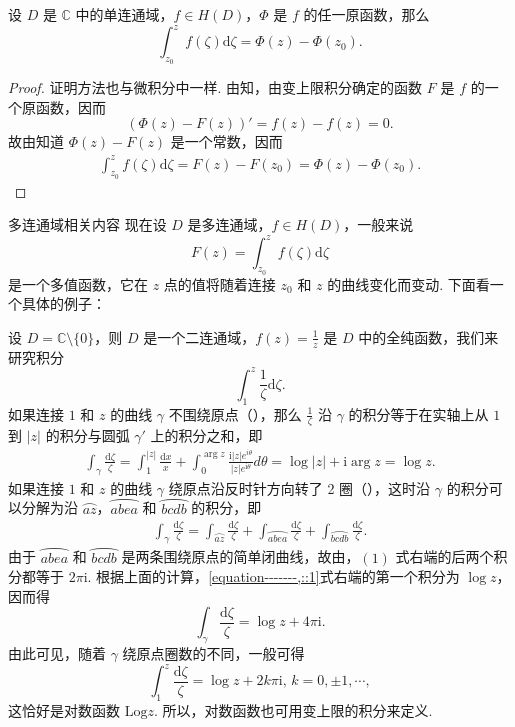 \documentclass[../../main.tex]{subfiles}
\begin{document}
\begin{theorem}\label{theorem:复积分的微分学基本定理}
设 \( D \) 是 \( \mathbb{C} \) 中的单连通域，\( f \in H(D) \)，\( \Phi \) 是 \( f \) 的任一原函数，那么
\[
\int_{z_0}^{z} f(\zeta) \mathrm{d}\zeta  = \Phi(z) - \Phi(z_0).
\]
\end{theorem}
\begin{proof}
证明方法也与微积分中一样. 由知，由变上限积分确定的函数 \( F \) 是 \( f \) 的一个原函数，因而
\[
(\Phi(z) - F(z))' = f(z) - f(z) = 0.
\]
故由知道 \( \Phi(z) - F(z) \) 是一个常数，因而
\begin{align*}
\int_{z_0}^{z} f(\zeta) \mathrm{d}\zeta  = F(z) - F(z_0) = \Phi(z) - \Phi(z_0).
\end{align*}

\end{proof}

多连通域相关内容
现在设 \( D \) 是多连通域，\( f \in H(D) \)，一般来说
\[
F(z) = \int_{z_0}^{z} f(\zeta) \mathrm{d}\zeta 
\]
是一个多值函数，它在 \( z \) 点的值将随着连接 \( z_0 \) 和 \( z \) 的曲线变化而变动. 下面看一个具体的例子：

设 \( D = \mathbb{C} \setminus \{0\} \)，则 \( D \) 是一个二连通域，\( f(z) = \frac{1}{z} \) 是 \( D \) 中的全纯函数，我们来研究积分
\[
\int_{1}^{z} \frac{1}{\zeta} \mathrm{d}\zeta .
\]
如果连接 \( 1 \) 和 \( z \) 的曲线 \( \gamma \) 不围绕原点（），那么 \( \frac{1}{\zeta} \) 沿 \( \gamma \) 的积分等于在实轴上从 \( 1 \) 到 \( |z| \) 的积分与圆弧 \( \gamma' \) 上的积分之和，即
\begin{align*}
\int_{\gamma} \frac{\mathrm{d}\zeta }{\zeta} = \int_{1}^{|z|} \frac{\mathrm{d}x}{x} + \int_{0}^{\arg z} \frac{\mathrm{i}|z|e^{i\theta}}{|z|e^{\mathrm{i}\theta}} d\theta = \log|z| + \mathrm{i}\arg z = \log z.
\end{align*}
如果连接 \( 1 \) 和 \( z \) 的曲线 \( \gamma \) 绕原点沿反时针方向转了 2 圈（），这时沿 \( \gamma \) 的积分可以分解为沿 \( \wideparen{az} \)，\( \wideparen{abea} \) 和 \( \wideparen{bcdb} \) 的积分，即
\begin{align}
\int_{\gamma} \frac{\mathrm{d}\zeta }{\zeta} = \int_{\wideparen{az}} \frac{\mathrm{d}\zeta }{\zeta} + \int_{\wideparen{abea}} \frac{\mathrm{d}\zeta }{\zeta} + \int_{\wideparen{bcdb}} \frac{\mathrm{d}\zeta }{\zeta}. \label{equation-------,::1}
\end{align}
由于 \( \wideparen{abea} \) 和 \( \wideparen{bcdb} \) 是两条围绕原点的简单闭曲线，故由，\((1)\) 式右端的后两个积分都等于 \( 2\pi \mathrm{i} \). 根据上面的计算，\eqref{equation-------,::1}式右端的第一个积分为 \( \log z \)，因而得
\[
\int_{\gamma} \frac{\mathrm{d}\zeta }{\zeta} = \log z + 4\pi \mathrm{i}.
\]
由此可见，随着 \( \gamma \) 绕原点圈数的不同，一般可得
\[
\int_{1}^{z} \frac{\mathrm{d}\zeta }{\zeta} = \log z + 2k\pi \mathrm{i}, \, k = 0, \pm 1, \cdots,
\]
这恰好是对数函数 \( \text{Log} z \). 所以，对数函数也可用变上限的积分来定义. 
\end{document}
